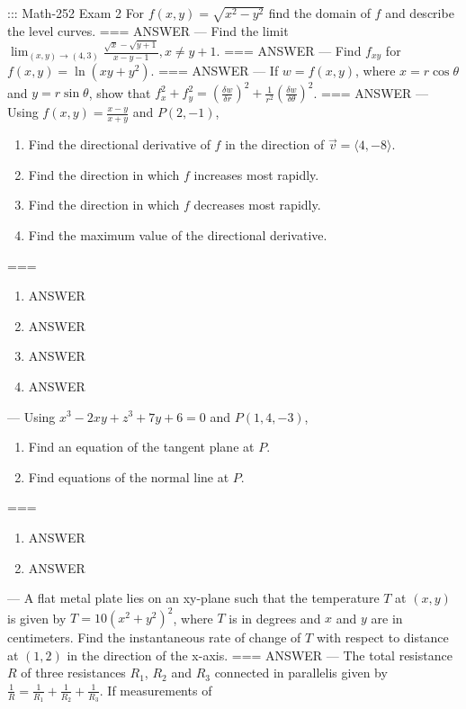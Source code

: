::: Math-252 Exam 2
For \(f(x,y)=\sqrt{x^2-y^2}\) find the domain of \(f\) and describe the level
curves.
===
ANSWER
---
Find the limit \(\lim_{(x,y)\to(4,3)}\frac{\sqrt x-\sqrt{y+1}}{x-y-1},x\neq
y+1\).
===
ANSWER
---
Find \(f_{xy}\) for \(f(x,y)=\ln(xy+y^2)\).
===
ANSWER
---
If \(w=f(x,y)\), where \(x=r\cos\theta\) and \(y=r\sin\theta\), show that
\(f_x^2+f_y^2=(\frac{\delta w}{\delta r})^2+\frac{1}{r^2}(\frac{\delta
w}{\delta\theta})^2\).
===
ANSWER
---
Using \(f(x,y)=\frac{x-y}{x+y}\) and \(P(2,-1)\),
\begin{enumerate}[label=\alph*.]
  \item Find the directional derivative of \(f\) in the direction of \(\vec
    v=\langle 4,-8\rangle\).
  \item Find the direction in which \(f\) increases most rapidly.
  \item Find the direction in which \(f\) decreases most rapidly.
  \item Find the maximum value of the directional derivative.
\end{enumerate}
===
\begin{enumerate}[label=\alph*.]
  \item ANSWER
  \item ANSWER
  \item ANSWER
  \item ANSWER
\end{enumerate}
---
Using \(x^3-2xy+z^3+7y+6=0\) and \(P(1,4,-3)\),
\begin{enumerate}[label=\alph*.]
  \item Find an equation of the tangent plane at \(P\).
  \item Find equations of the normal line at \(P\).
\end{enumerate}
===
\begin{enumerate}[label=\alph*.]
  \item ANSWER
  \item ANSWER
\end{enumerate}
---
A flat metal plate lies on an xy-plane such that the temperature \(T\) at
\((x,y)\) is given by \(T=10(x^2+y^2)^2\), where \(T\) is in degrees and \(x\)
and \(y\) are in centimeters. Find the instantaneous rate of change of \(T\)
with respect to distance at \((1,2)\) in the direction of the x-axis.
===
ANSWER
---
The total resistance \(R\) of three resistances \(R_1\), \(R_2\) and \(R_3\)
connected in parallelis given by
\(\frac{1}{R}=\frac{1}{R_1}+\frac{1}{R_2}+\frac{1}{R_3}\). If measurements of

